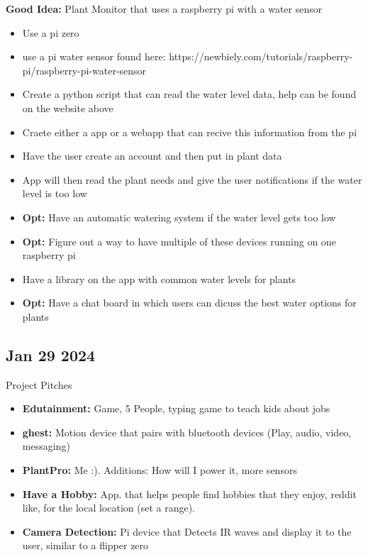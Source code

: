 \documentclass[12pt]{article}
\begin{document}
\textbf{Good Idea:} Plant Monitor that uses a raspberry pi with a water sensor
\begin{itemize}
		  \item Use a pi zero 
		  \item use a pi water sensor found here: https://newbiely.com/tutorials/raspberry-pi/raspberry-pi-water-sensor
		  \item Create a python script that can read the water level data, help can be found on the website above 
		  \item Craete either a app or a webapp that can recive this information from the pi
		  \item Have the user create an account and then put in plant data
		  \item App will then read the plant needs and give the user notifications if the water level is too low
		  \item \textbf{Opt:} Have an automatic watering system if the water level gets too low
		  \item \textbf{Opt:} Figure out a way to have multiple of these devices running on one raspberry pi
		  \item Have a library on the app with common water levels for plants 
		  \item \textbf{Opt:} Have a chat board in which users can dicuss the best water options for plants 
\end{itemize}

\subsection{Jan 29 2024}

Project Pitches

\begin{itemize}
		  \item \textbf{Edutainment:} Game, 5 People, typing game to teach kids about jobs 
		  \item \textbf{ghest:} Motion device that pairs with bluetooth devices (Play, audio, video, messaging)
		  \item \textbf{PlantPro:} Me :). Additions: How will I power it, more sensors
		  \item \textbf{Have a Hobby:} App. that helps people find hobbies that they enjoy, reddit like, for 
					 the local location (set a range).
		  \item \textbf{Camera Detection:} Pi device that Detects IR waves and display it to the user, similar
					 to a flipper zero
\end{itemize}
\end{document}
